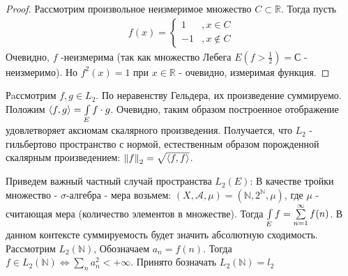 \begin{proof}
	Рассмотрим произвольное неизмеримое множество $C \subset \mathbb{R}$. Тогда пусть
	\begin{gather*}
		f(x) = 
		\begin{cases}
			1  &, x \in C \\
			-1 &, x \notin C
		\end{cases}
	\end{gather*}
	Очевидно, $f$ -неизмерима (так как множество Лебега $E(f > \frac{1}{2}) = С$ - неизмеримо). Но $f^2(x) = 1$ при $x \in \mathbb{R}$ - очевидно, измеримая функция.
\end{proof}


Рaссмотрим $f, g \in L_2$. По неравенству Гельдера, их произведение суммируемо. Положим $\langle f , g\rangle = \int\limits_{E} f\cdot g$. 
Очевидно, таким образом построенное отображение удовлетворяет аксиомам скалярного произведения. 
Получается, что $L_2$ - гильбертово пространство с нормой, естественным образом порожденной скалярным произведением: $\left\|f\right\|_{2} = \sqrt{\langle f , f\rangle}$.\newline

Приведем важный частный случай пространства $L_2(E)$: В качестве тройки множество - $\sigma$-алгебра - мера возьмем: 
$\left(X, \mathscr{A}, \mu \right) = \left(\mathbb{N}, 2^{\mathbb{N}}, \mu\right)$, где $\mu$ - считающая мера (количество элементов в множестве).
Тогда $\int\limits_{E} f = \sum\limits_{n = 1}^{\infty} f(n)$. В данном контексте суммируемость будет значить абсолютную сходимость.
\newline 
Рассмотрим $L_2(\mathbb{N})$, Обозначаем $a_n = f(n)$. Тогда $f \in L_2 (\mathbb{N}) \Leftrightarrow \sum\limits_{n} a^2_n < +\infty$. Принято бозначать $L_2(\mathbb{N}) = l_2$
\newpage


